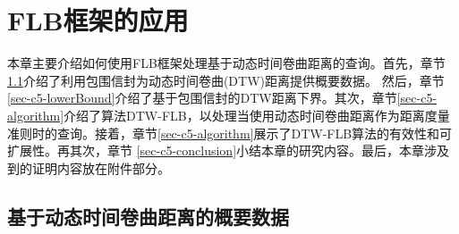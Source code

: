 \chapter{FLB框架的应用}\label{chapter:FLBDTW}

本章主要介绍如何使用FLB框架处理基于动态时间卷曲距离的查询。首先，章节\ref{sec-c5-DTWsummary}介绍了利用包围信封为动态时间卷曲(DTW)距离提供概要数据。 然后，章节\ref{sec-c5-lowerBound}介绍了基于包围信封的DTW距离下界。其次，章节\ref{sec-c5-algorithm}介绍了算法DTW-FLB，以处理当使用动态时间卷曲距离作为距离度量准则时的查询。接着，章节\ref{sec-c5-algorithm}展示了DTW-FLB算法的有效性和可扩展性。再其次，章节 \ref{sec-c5-conclusion}小结本章的研究内容。最后，本章涉及到的证明内容放在附件部分。


\section{基于动态时间卷曲距离的概要数据}\label{sec-c5-DTWsummary}

